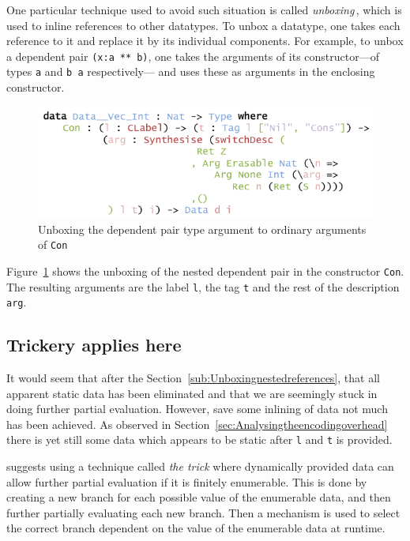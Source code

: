 \documentclass{ituthesis}
\newcommand{\ttconstructor}[1]{\textcolor{constructor-color}{\texttt{#1}}}
\newcommand{\tttype}[1]{\textcolor{type-color}{\texttt{#1}}}
\newcommand{\ttvar}[1]{\textcolor{local-var-color}{\texttt{#1}}}
\theoremstyle{break}
\begin{document}
One particular technique used to avoid such situation is called \textit{unboxing}\,\autocite{Jones91unboxedvalues,Leroy97theeffectiveness}, which is used to inline references to other datatypes.
To unbox a datatype, one takes each reference to it and replace it by its individual components.
For example, to unbox a dependent pair \tttype{(}\ttvar{x}\texttt{:}\ttvar{a}~\tttype{**}~\ttvar{b}\tttype{)}, one takes the arguments of its constructor---of types \ttvar{a} and \ttvar{b a} respectively---
and uses these as arguments in the enclosing constructor.

\begin{figure}[ht]
\begin{center}
    \includegraphics[scale=0.5]{Figures/PEUnboxing.png}
\end{center}
\caption{Unboxing the dependent pair type argument to ordinary arguments of \ttconstructor{Con}}
\label{fig:peunbox}
\end{figure}

Figure~\ref{fig:peunbox} shows the unboxing of the nested dependent pair in the constructor \ttconstructor{Con}.
The resulting arguments are the label \ttvar{l}, the tag \ttvar{t} and the rest of the description \ttvar{arg}.

\subsection{Trickery applies here}
\label{sub:Trickery applies here}
It would seem that after the Section~\ref{sub:Unboxingnestedreferences}, that all apparent static data has been eliminated and that we are seemingly stuck in doing further partial evaluation.
However, save some inlining of data not much has been achieved.
As observed in Section~\ref{sec:Analysingtheencodingoverhead} there is yet still some data which appears to be static after \ttvar{l} and \ttvar{t} is provided.

\textcite{Jones:1993:PEA:153676} suggests using a technique called \textit{the trick} where dynamically provided data can allow further partial evaluation if it is finitely enumerable.
This is done by creating a new branch for each possible value of the enumerable data, and then further partially evaluating each new branch.
Then a mechanism is used to select the correct branch dependent on the value of the enumerable data at runtime.
\end{document}
